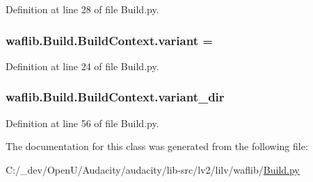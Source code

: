 Definition at line 28 of file Build.\+py.

\subsubsection[{\texorpdfstring{variant}{variant}}]{ waflib.\+Build.\+Build\+Context.\+variant = \textquotesingle{}\textquotesingle{}\hspace{0.3cm}{\ttfamily [static]}}\hypertarget{classwaflib_1_1_build_1_1_build_context_adda902ea10ee8897c82d3b0fdce80f70}{}\label{classwaflib_1_1_build_1_1_build_context_adda902ea10ee8897c82d3b0fdce80f70}


Definition at line 24 of file Build.\+py.

\subsubsection[{\texorpdfstring{variant\+\_\+dir}{variant_dir}}]{\setlength{\rightskip}{0pt plus 5cm}waflib.\+Build.\+Build\+Context.\+variant\+\_\+dir\hspace{0.3cm}{\ttfamily [static]}}\hypertarget{classwaflib_1_1_build_1_1_build_context_a0d115c8c08ca79f8bfb90c55c688814e}{}\label{classwaflib_1_1_build_1_1_build_context_a0d115c8c08ca79f8bfb90c55c688814e}


Definition at line 56 of file Build.\+py.



The documentation for this class was generated from the following file\+:\begin{DoxyCompactItemize}
\item 
C\+:/\+\_\+dev/\+Open\+U/\+Audacity/audacity/lib-\/src/lv2/lilv/waflib/\hyperlink{lilv_2waflib_2_build_8py}{Build.\+py}\end{DoxyCompactItemize}
